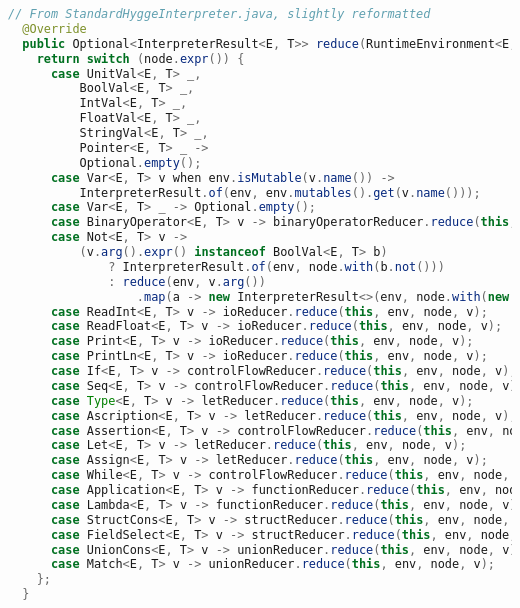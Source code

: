 \begin{lstlisting}[language=Java]
  // From StandardHyggeInterpreter.java, slightly reformatted
  @Override
  public Optional<InterpreterResult<E, T>> reduce(RuntimeEnvironment<E, T> env, Node<E, T> node) {
    return switch (node.expr()) {
      case UnitVal<E, T> _,
          BoolVal<E, T> _,
          IntVal<E, T> _,
          FloatVal<E, T> _,
          StringVal<E, T> _,
          Pointer<E, T> _ ->
          Optional.empty();
      case Var<E, T> v when env.isMutable(v.name()) ->
          InterpreterResult.of(env, env.mutables().get(v.name()));
      case Var<E, T> _ -> Optional.empty();
      case BinaryOperator<E, T> v -> binaryOperatorReducer.reduce(this, env, node, v);
      case Not<E, T> v ->
          (v.arg().expr() instanceof BoolVal<E, T> b)
              ? InterpreterResult.of(env, node.with(b.not()))
              : reduce(env, v.arg())
                  .map(a -> new InterpreterResult<>(env, node.with(new Not<>(a.node()))));
      case ReadInt<E, T> v -> ioReducer.reduce(this, env, node, v);
      case ReadFloat<E, T> v -> ioReducer.reduce(this, env, node, v);
      case Print<E, T> v -> ioReducer.reduce(this, env, node, v);
      case PrintLn<E, T> v -> ioReducer.reduce(this, env, node, v);
      case If<E, T> v -> controlFlowReducer.reduce(this, env, node, v);
      case Seq<E, T> v -> controlFlowReducer.reduce(this, env, node, v);
      case Type<E, T> v -> letReducer.reduce(this, env, node, v);
      case Ascription<E, T> v -> letReducer.reduce(this, env, node, v);
      case Assertion<E, T> v -> controlFlowReducer.reduce(this, env, node, v);
      case Let<E, T> v -> letReducer.reduce(this, env, node, v);
      case Assign<E, T> v -> letReducer.reduce(this, env, node, v);
      case While<E, T> v -> controlFlowReducer.reduce(this, env, node, v);
      case Application<E, T> v -> functionReducer.reduce(this, env, node, v);
      case Lambda<E, T> v -> functionReducer.reduce(this, env, node, v);
      case StructCons<E, T> v -> structReducer.reduce(this, env, node, v);
      case FieldSelect<E, T> v -> structReducer.reduce(this, env, node, v);
      case UnionCons<E, T> v -> unionReducer.reduce(this, env, node, v);
      case Match<E, T> v -> unionReducer.reduce(this, env, node, v);
    };
  }
\end{lstlisting}

